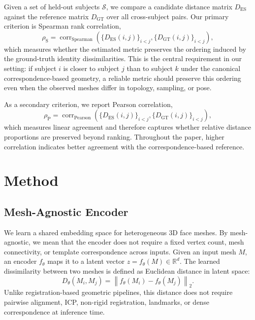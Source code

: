 \documentclass[10pt,twocolumn,letterpaper]{article}
\begin{document}
Given a set of held-out subjects $\mathcal S$, we compare a candidate distance matrix $D_{\mathrm{ES}}$ against the reference matrix $D_{\mathrm{GT}}$ over all cross-subject pairs. Our primary criterion is Spearman rank correlation,
\begin{equation}
\rho_{\mathrm{S}}
=
\operatorname{corr}_{\mathrm{Spearman}}
\left(
\{D_{\mathrm{ES}}(i,j)\}_{i<j},
\{D_{\mathrm{GT}}(i,j)\}_{i<j}
\right), 
\label{eq:spearman_correlation}
\end{equation}
which measures whether the estimated metric preserves the ordering induced by the ground-truth identity dissimilarities. This is the central requirement in our setting: if subject $i$ is closer to subject $j$ than to subject $k$ under the canonical correspondence-based geometry, a reliable metric should preserve this ordering even when the observed meshes differ in topology, sampling, or pose.

As a secondary criterion, we report Pearson correlation,
\begin{equation}
\rho_{\mathrm{P}}
=
\operatorname{corr}_{\mathrm{Pearson}}
\left(
\{D_{\mathrm{ES}}(i,j)\}_{i<j},
\{D_{\mathrm{GT}}(i,j)\}_{i<j}
\right), 
\label{eq:pearson_correlation}
\end{equation}
which measures linear agreement and therefore captures whether relative distance proportions are preserved beyond ranking. Throughout the paper, higher correlation indicates better agreement with the correspondence-based reference.

\section{Method}
\label{sec:method}

\subsection{Mesh-Agnostic Encoder}
\label{sec:encoder}
We learn a shared embedding space for heterogeneous 3D face meshes. By mesh-agnostic, we mean that the encoder does not require a fixed vertex count, mesh connectivity, or template correspondence across inputs. Given an input mesh $M$, an encoder $f_\theta$ maps it to a latent vector $z=f_\theta(M)\in\mathbb{R}^d$. The learned dissimilarity between two meshes is defined as Euclidean distance in latent space:
\begin{equation}
D_{\theta}(M_i,M_j)
=
\left\|
f_{\theta}(M_i)-f_{\theta}(M_j)
\right\|_2 .
\end{equation}
Unlike registration-based geometric pipelines, this distance does not require pairwise alignment, ICP, non-rigid registration, landmarks, or dense correspondence at inference time.
\end{document}
